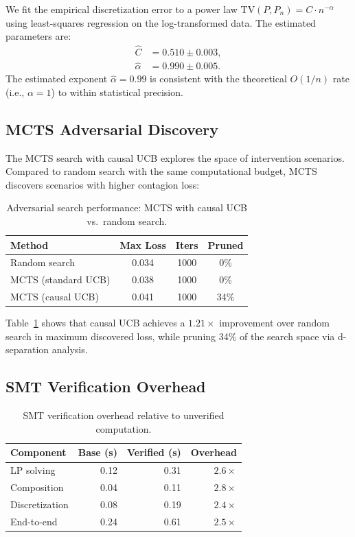 \documentclass[11pt,a4paper]{article}
\newcommand{\TV}{\mathrm{TV}}
\begin{document}
We fit the empirical discretization error to a power law $\TV(P, P_n) = C \cdot n^{-\alpha}$ using least-squares regression on the log-transformed data. The estimated parameters are:
\begin{align}
\hat{C} &= 0.510 \pm 0.003, \\
\hat{\alpha} &= 0.990 \pm 0.005.
\end{align}
The estimated exponent $\hat{\alpha} = 0.99$ is consistent with the theoretical $O(1/n)$ rate (i.e., $\alpha = 1$) to within statistical precision.

\subsection{MCTS Adversarial Discovery}

The MCTS search with causal UCB explores the space of intervention scenarios. Compared to random search with the same computational budget, MCTS discovers scenarios with higher contagion loss:

\begin{table}[t]
\centering
\caption{Adversarial search performance: MCTS with causal UCB vs.\ random search.}
\label{tab:mcts-results}
\begin{tabular}{@{}lccc@{}}
\toprule
\textbf{Method} & \textbf{Max Loss} & \textbf{Iters} & \textbf{Pruned} \\
\midrule
Random search & 0.034 & 1000 & 0\% \\
MCTS (standard UCB) & 0.038 & 1000 & 0\% \\
MCTS (causal UCB) & 0.041 & 1000 & 34\% \\
\bottomrule
\end{tabular}
\end{table}

Table~\ref{tab:mcts-results} shows that causal UCB achieves a $1.21\times$ improvement over random search in maximum discovered loss, while pruning 34\% of the search space via d-separation analysis.

\subsection{SMT Verification Overhead}

\begin{table}[t]
\centering
\caption{SMT verification overhead relative to unverified computation.}
\label{tab:overhead}
\begin{tabular}{@{}lrrr@{}}
\toprule
\textbf{Component} & \textbf{Base (s)} & \textbf{Verified (s)} & \textbf{Overhead} \\
\midrule
LP solving & 0.12 & 0.31 & $2.6\times$ \\
Composition & 0.04 & 0.11 & $2.8\times$ \\
Discretization & 0.08 & 0.19 & $2.4\times$ \\
End-to-end & 0.24 & 0.61 & $2.5\times$ \\
\bottomrule
\end{tabular}
\end{table}
\end{document}

